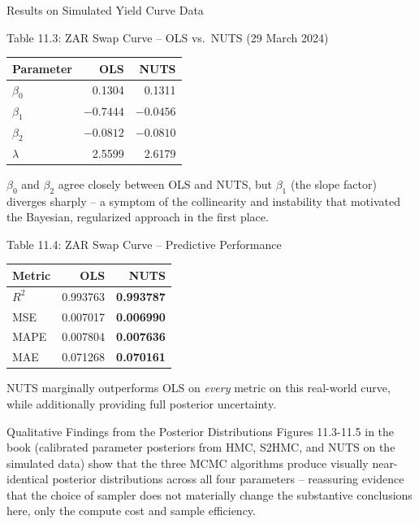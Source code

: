 \documentclass[aspectratio=169,10pt]{beamer}
\begin{document}
\begin{frame}[allowframebreaks]{Results on Simulated Yield Curve Data}
\begin{block}{Table 11.3: ZAR Swap Curve -- OLS vs.\ NUTS (29 March 2024)}
  \begin{center}
  \begin{tabular}{lrr}
    \toprule
    Parameter & OLS & NUTS \\
    \midrule
    $\beta_0$ & 0.1304  & 0.1311 \\
    $\beta_1$ & $-0.7444$ & $-0.0456$ \\
    $\beta_2$ & $-0.0812$ & $-0.0810$ \\
    $\lambda$ & 2.5599  & 2.6179 \\
    \bottomrule
  \end{tabular}
  \end{center}
  $\beta_0$ and $\beta_2$ agree closely between OLS and NUTS, but
  $\beta_1$ (the slope factor) diverges sharply -- a symptom of the
  collinearity and instability that motivated the Bayesian, regularized
  approach in the first place.
\end{block}

\begin{block}{Table 11.4: ZAR Swap Curve -- Predictive Performance}
  \begin{center}
  \begin{tabular}{lrr}
    \toprule
    Metric & OLS & NUTS \\
    \midrule
    $R^2$   & 0.993763 & \textbf{0.993787} \\
    MSE     & 0.007017 & \textbf{0.006990} \\
    MAPE    & 0.007804 & \textbf{0.007636} \\
    MAE     & 0.071268 & \textbf{0.070161} \\
    \bottomrule
  \end{tabular}
  \end{center}
  NUTS marginally outperforms OLS on \emph{every} metric on this real-world
  curve, while additionally providing full posterior uncertainty.
\end{block}

\framebreak

\begin{block}{Qualitative Findings from the Posterior Distributions}
  Figures 11.3-11.5 in the book (calibrated parameter posteriors from HMC,
  S2HMC, and NUTS on the simulated data) show that the three MCMC
  algorithms produce visually near-identical posterior distributions
  across all four parameters -- reassuring evidence that the choice of
  sampler does not materially change the substantive conclusions here, only
  the compute cost and sample efficiency.
\end{block}


\end{frame}
\end{document}
